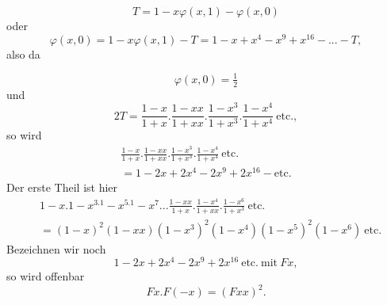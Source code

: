 \[T=1-x\varphi(x,1)-\varphi(x,0)\]
\noindent oder
\[\varphi(x,0)=1-x\varphi(x,1)-T=1-x+x^4-x^9+x^{16}-{.}{.}{.}-T,\]
\noindent also da
\par\noindent{\small[S. 42]}\par
\[\varphi(x,0)=\tfrac12\]
\noindent und
\[2T=\frac{1-x}{1+x}.\frac{1-xx}{1+xx}.\frac{1-x^3}{1+x^3}.\frac{1-x^4}{1+x^4}\ \text{etc.},\]
\noindent so wird
\[\begin{gathered}
\frac{1-x}{1+x}.\frac{1-xx}{1+xx}.\frac{1-x^3}{1+x^3}.\frac{1-x^4}{1+x^4}\ \text{etc.}\\
=1-2x+2x^4-2x^9+2x^{16}-\text{etc.}
\end{gathered}\]
\noindent Der erste Theil ist hier
\[\begin{aligned}
&1-x.1-x^3.1-x^5.1-x^7{.}{.}{.}\frac{1-xx}{1+x}.\frac{1-x^4}{1+xx}.\frac{1-x^6}{1+x^3}\ \text{etc.}\\
&=(1-x)^2(1-xx)(1-x^3)^2(1-x^4)(1-x^5)^2(1-x^6)\ \text{etc.}
\end{aligned}\]
\noindent Bezeichnen wir noch
\[1-2x+2x^4-2x^9+2x^{16}\ \text{etc.}\ \text{mit}\ Fx,\]
\noindent so wird offenbar
\[Fx.F(-x)=(Fxx)^2.\]
\clearpage
\endgroup

